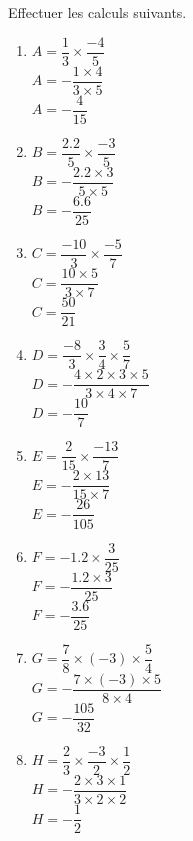 \begin{corrige}
    Effectuer les calculs suivants.
    \begin{spacing}{1.7}
        \begin{multicols}{2}
            \begin{enumerate}
                \item $A=\dfrac{1}{3}\times\dfrac{-4}{5}$\\
                {\red $A=-\dfrac{1\times 4}{3\times 5}$\\$A=-\dfrac{4}{15}$}
                \item $B=\dfrac{\num{2.2}}{5}\times\dfrac{-3}{5}$\\
                {\red $B=-\dfrac{\num{2.2}\times 3}{5\times 5}$\\$B=-\dfrac{\num{6.6}}{25}$}
                \item $C=\dfrac{-10}{3}\times\dfrac{-5}{7}$\\
                {\red $C=\dfrac{10\times 5}{3\times 7}$\\$C=\dfrac{50}{21}$}
                \item $D=\dfrac{-8}{3}\times\dfrac{3}{4}\times\dfrac{5}{7}$\\
                {\red $D=-\dfrac{4\times 2\times 3\times 5}{3\times 4\times 7}$\\$D=-\dfrac{10}{7}$}
                \item $E=\dfrac{2}{15}\times\dfrac{-13}{7}$\\
                {\red $E=-\dfrac{2\times 13}{15\times 7}$\\$E=-\dfrac{26}{105}$}
                \item $F=\num{-1.2}\times\dfrac{3}{25}$\\
                {\red $F=-\dfrac{\num{1.2}\times3}{25}$\\$F=-\dfrac{\num{3.6}}{25}$}
                \item $G=\dfrac{7}{8}\times (-3)\times\dfrac{5}{4}$\\
                {\red $G=-\dfrac{7\times (-3)\times 5}{8\times 4}$\\$G=-\dfrac{105}{32}$}
                \item $H=\dfrac{2}{3}\times\dfrac{-3}{2}\times\dfrac{1}{2}$\\
                {\red $H=-\dfrac{2\times 3\times 1}{3\times 2\times 2}$\\$H=-\dfrac{1}{2}$}
            \end{enumerate}
        \end{multicols}
    \end{spacing}
\end{corrige}

